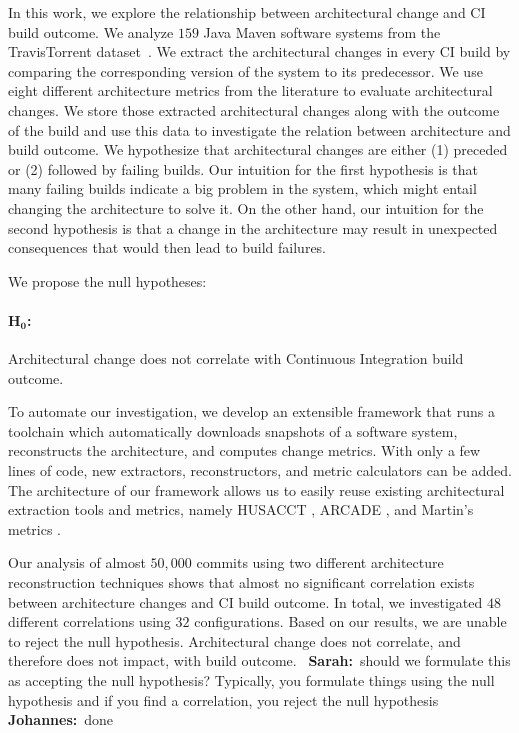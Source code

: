 \documentclass[sigplan, anonymous, review]{acmart}
\newcommand{\sn}[1]{{\color{blue}\textbf{Sarah:}~#1}}
\newcommand{\jk}[1]{{\color{violet}\textbf{Johannes:}~#1}}
\begin{document}
In this work, we explore the relationship between architectural change and CI build outcome.
We analyze $159$ Java Maven software systems from the TravisTorrent dataset~\cite{TravisTorrent}. 
We extract the architectural changes in every CI build by comparing the corresponding version of the system to its predecessor.
We use eight different architecture metrics from the literature to evaluate architectural changes.  
We store those extracted architectural changes along with the outcome of the build and use this data to investigate the relation between architecture and build outcome.
We hypothesize that architectural changes are either (1) preceded or (2) followed by failing builds. 
Our intuition for the first hypothesis is that many failing builds indicate a big problem in the system, which might entail changing the architecture to solve it. 
On the other hand, our intuition for the second hypothesis is that a change in the architecture may result in unexpected consequences that would then lead to build failures.

We propose the null hypotheses:

\paragraph{$\mathbf{H_0}$:} Architectural change does not correlate with Continuous Integration build outcome. 

To automate our investigation, we develop an extensible framework that runs a toolchain which automatically downloads snapshots of a software system, reconstructs the architecture, and computes change metrics. With only a few lines of code, new extractors, reconstructors, and metric calculators can be added. 
The architecture of our framework allows us to easily reuse existing architectural extraction tools and metrics, namely HUSACCT \cite{Husacct1}, ARCADE \cite{Arcade}, and Martin's metrics \cite{martinsMetrics}.

Our analysis of almost $50,000$ commits using two different architecture reconstruction techniques shows that almost no significant correlation exists between architecture changes and CI build outcome. In total, we investigated $48$ different correlations using $32$ configurations. Based on our results, we are unable to reject the null hypothesis. Architectural change does not correlate, and therefore does not impact, with build outcome.
~\sn{should we formulate this as accepting the null hypothesis? Typically, you formulate things using the null hypothesis and if you find a correlation, you reject the null hypothesis} \jk{done}
\end{document}
